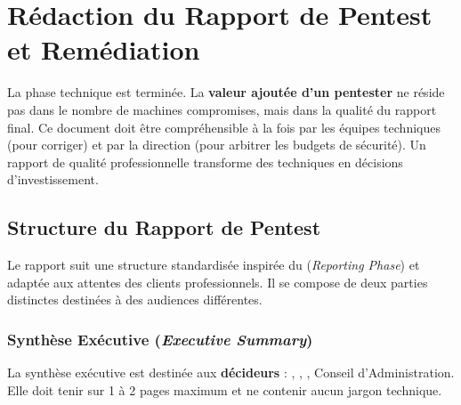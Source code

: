 

\chapter{Rédaction du Rapport de Pentest et Remédiation}
\label{chap:reporting}

La phase technique est terminée. La \textbf{valeur ajoutée d'un pentester}
ne réside pas dans le nombre de machines compromises, mais dans la qualité
du rapport final. Ce document doit être compréhensible à la fois par les
équipes techniques (pour corriger) et par la direction (pour arbitrer les
budgets de sécurité). Un rapport de qualité professionnelle transforme des
 techniques en décisions d'investissement.

\section{Structure du Rapport de Pentest}
\label{sec:rapport_structure}

Le rapport suit une structure standardisée inspirée du 
(\textit{Reporting Phase}) et adaptée aux attentes des clients
professionnels. Il se compose de deux parties distinctes destinées à des
audiences différentes.

\subsection{Synthèse Exécutive (\textit{Executive Summary})}
\label{subsec:exec_summary}

La synthèse exécutive est destinée aux \textbf{décideurs} : ,
, , Conseil d'Administration. Elle doit tenir sur
1 à 2 pages maximum et ne contenir aucun jargon technique.

